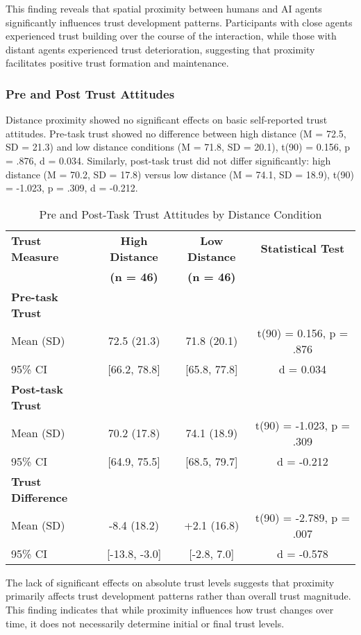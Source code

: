 \documentclass[12pt]{article}
\begin{document}
This finding reveals that spatial proximity between humans and AI agents significantly influences trust development patterns. Participants with close agents experienced trust building over the course of the interaction, while those with distant agents experienced trust deterioration, suggesting that proximity facilitates positive trust formation and maintenance.

\subsubsection{Pre and Post Trust Attitudes}

Distance proximity showed no significant effects on basic self-reported trust attitudes. Pre-task trust showed no difference between high distance (M = 72.5, SD = 21.3) and low distance conditions (M = 71.8, SD = 20.1), t(90) = 0.156, p = .876, d = 0.034. Similarly, post-task trust did not differ significantly: high distance (M = 70.2, SD = 17.8) versus low distance (M = 74.1, SD = 18.9), t(90) = -1.023, p = .309, d = -0.212.

\begin{table}[h]
\centering
\caption{Pre and Post-Task Trust Attitudes by Distance Condition}
\begin{tabular}{@{}lccc@{}}
\toprule
\textbf{Trust Measure} & \textbf{High Distance} & \textbf{Low Distance} & \textbf{Statistical Test} \\
& \textbf{(n = 46)} & \textbf{(n = 46)} & \\
\midrule
\textbf{Pre-task Trust} & & & \\
Mean (SD) & 72.5 (21.3) & 71.8 (20.1) & t(90) = 0.156, p = .876 \\
95\% CI & [66.2, 78.8] & [65.8, 77.8] & d = 0.034 \\
\midrule
\textbf{Post-task Trust} & & & \\
Mean (SD) & 70.2 (17.8) & 74.1 (18.9) & t(90) = -1.023, p = .309 \\
95\% CI & [64.9, 75.5] & [68.5, 79.7] & d = -0.212 \\
\midrule
\textbf{Trust Difference} & & & \\
Mean (SD) & -8.4 (18.2) & +2.1 (16.8) & t(90) = -2.789, p = .007 \\
95\% CI & [-13.8, -3.0] & [-2.8, 7.0] & d = -0.578 \\
\bottomrule
\end{tabular}
\end{table}

The lack of significant effects on absolute trust levels suggests that proximity primarily affects trust development patterns rather than overall trust magnitude. This finding indicates that while proximity influences how trust changes over time, it does not necessarily determine initial or final trust levels.
\end{document}
